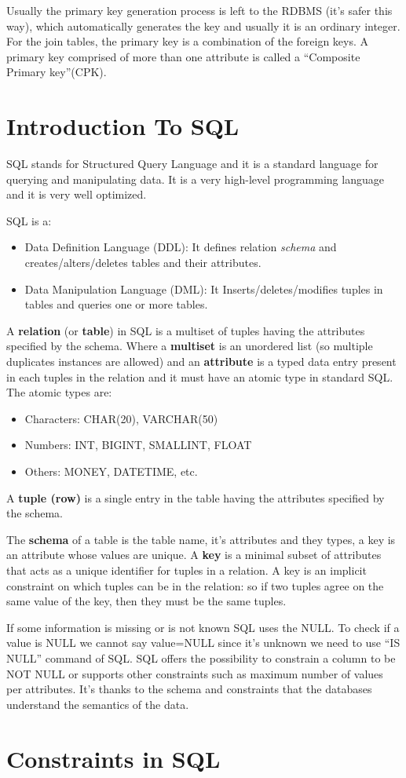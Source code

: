 \documentclass[a4page, 11pt]{article}
\begin{document}
Usually the primary key generation process is left to the RDBMS (it's safer this way), which automatically generates the key and usually it is an ordinary integer.
For the join tables, the primary key is a combination of the foreign keys. A primary key comprised of more than one attribute is called a ``Composite Primary key''(CPK).

\section{Introduction To SQL}
SQL stands for Structured Query Language and it is a standard language for querying and manipulating data. It is a very high-level programming language and it is very well optimized.


SQL is a:
\begin{itemize}[noitemsep]
	\item Data Definition Language (DDL):\newline
	 It defines relation \textit{schema} and creates/alters/deletes tables and their attributes.
	\item Data Manipulation Language (DML):\newline
	It Inserts/deletes/modifies tuples in tables and queries one or more tables.
\end{itemize}

A \textbf{relation} (or \textbf{table}) in SQL is a multiset of tuples having the attributes specified by the schema. Where a \textbf{multiset} is an unordered list (so multiple duplicates instances are allowed) and an \textbf{attribute} is a typed data entry present in each tuples in the relation and it must have an atomic type in standard SQL. The atomic types are:
\begin{itemize}
	\item Characters: CHAR(20), VARCHAR(50)
	\item Numbers: INT, BIGINT, SMALLINT, FLOAT
	\item Others: MONEY, DATETIME, etc.
\end{itemize}
A \textbf{tuple (row)} is a single entry in the table having the attributes specified by the schema.

The \textbf{schema} of a table is the table name, it's attributes and they types, a key is an attribute whose values are unique. A \textbf{key} is a minimal subset of attributes that acts as a unique identifier for tuples in a relation. A key is an implicit constraint on which tuples can be in the relation: so if two tuples agree on the same value of the key, then they must be the same tuples. 

If some information is missing or is not known SQL uses the NULL. To check if a value is NULL we cannot say value=NULL since it's unknown we need to use ``IS NULL'' command of SQL. SQL offers the possibility to constrain a column to be NOT NULL or supports other constraints such as maximum number of values per attributes.
It's thanks to the schema and constraints that the databases understand the semantics of the data.

\section{Constraints in SQL}
\end{document}
